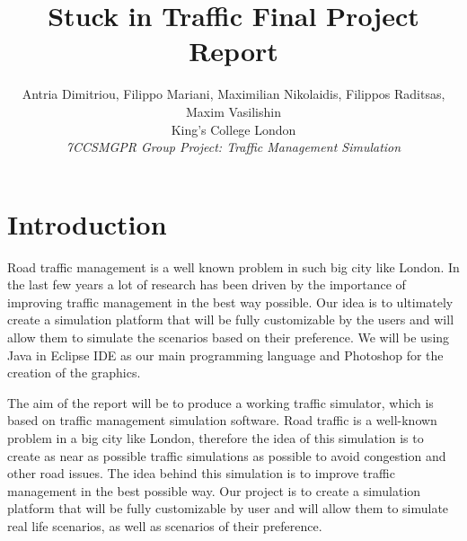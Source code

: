 \documentclass[oneside]{article}
\title{\vspace{-20mm}\fontsize{20pt}{10pt}\selectfont\textbf{Stuck in Traffic Final Project Report}}
\author{
\large
{Antria Dimitriou, Filippo Mariani, Maximilian Nikolaidis, Filippos Raditsas, Maxim Vasilishin}\\[10mm] %
\normalsize King's College London \\ [50mm] %
\normalsize {\textit{7CCSMGPR Group Project: Traffic Management Simulation}}
\vspace{-85mm}
}
\date{}
\begin{document}
\maketitle %







\newpage

\section{Introduction}

Road traffic management is a well known problem in such big city like London. In the last few years a lot of research has been driven by the importance of improving traffic management in the best way possible. Our idea is to ultimately create a simulation platform that will be fully customizable by the users and will allow them to simulate the scenarios based on their preference. We will be using Java in Eclipse IDE as our main programming language and Photoshop for the creation of the graphics.
\newline

\noindent The aim of the report will be to produce a working traffic simulator, which is based on traffic management simulation software. Road traffic is a well-known problem in a big city like London, therefore the idea of this simulation is to create as near as possible traffic simulations as possible to avoid congestion and other road issues. The idea behind this simulation is to improve traffic management in the best possible way. Our project is to create a simulation platform that will be fully customizable by user and will allow them to simulate real life scenarios, as well as scenarios of their preference.
\newline
\end{document}
